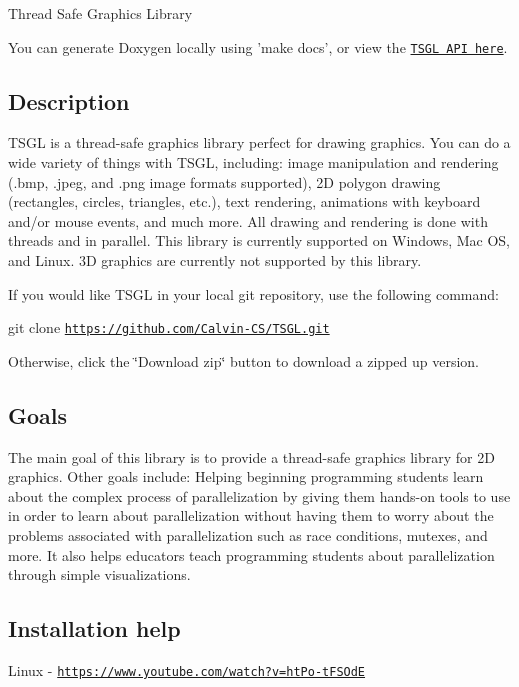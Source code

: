 Thread Safe Graphics Library

You can generate Doxygen locally using 'make docs', or view the \href{http://calvin-cs.github.io/TSGL/html/index.html}{\tt T\-S\-G\-L A\-P\-I here}. 

 \subsection*{Description }

T\-S\-G\-L is a thread-\/safe graphics library perfect for drawing graphics. You can do a wide variety of things with T\-S\-G\-L, including\-: image manipulation and rendering (.bmp, .jpeg, and .png image formats supported), 2\-D polygon drawing (rectangles, circles, triangles, etc.), text rendering, animations with keyboard and/or mouse events, and much more. All drawing and rendering is done with threads and in parallel. This library is currently supported on Windows, Mac O\-S, and Linux. 3\-D graphics are currently not supported by this library.

If you would like T\-S\-G\-L in your local git repository, use the following command\-:

git clone \href{https://github.com/Calvin-CS/TSGL.git}{\tt https\-://github.\-com/\-Calvin-\/\-C\-S/\-T\-S\-G\-L.\-git}

Otherwise, click the \char`\"{}\-Download zip\char`\"{} button to download a zipped up version. 

 \subsection*{Goals }

The main goal of this library is to provide a thread-\/safe graphics library for 2\-D graphics. Other goals include\-: Helping beginning programming students learn about the complex process of parallelization by giving them hands-\/on tools to use in order to learn about parallelization without having them to worry about the problems associated with parallelization such as race conditions, mutexes, and more. It also helps educators teach programming students about parallelization through simple visualizations. 

 \subsection*{Installation help }

Linux -\/ \href{https://www.youtube.com/watch?v=htPo-tFSOdE}{\tt https\-://www.\-youtube.\-com/watch?v=ht\-Po-\/t\-F\-S\-Od\-E}


